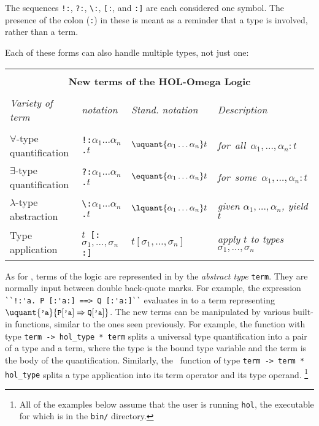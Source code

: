 The sequences {\small\verb|!:|}, {\small\verb|?:|}, {\small\verb|\:|},
{\small\verb|[:|}, and {\small\verb|:]|} are each considered one symbol.
The presence of the colon ({\small\verb|:|}) in these is meant as a reminder
that a type is involved, rather than a term.

Each of these forms can also handle multiple types, not just one:
\begin{center}
\begin{tabular}{|l|l|l|l|} \hline
\multicolumn{4}{|c|}{ } \\
\multicolumn{4}{|c|}{\bf New terms of the HOL-Omega Logic} \\
\multicolumn{4}{|c|}{ } \\
{\it Variety of term} & {\it \HOL{${}_\omega$} notation} &
{\it Stand. notation} &
{\it Description} \\ \hline
 & & & \\
$\forall$-type quantification & {\small\verb|!:|}$\alpha_1\ldots\alpha_n${\small\verb|.|}$t$ &
$\uquant{\alpha_1\ldots\alpha_n}t$ & {\it for\ all\ }$\alpha_1,\ldots,\alpha_n: t$ \\ \hline
$\exists$-type quantification & {\small\verb|?:|}$\alpha_1\ldots\alpha_n${\small\verb|.|}$t$ &
$\equant{\alpha_1\ldots\alpha_n}t$ & {\it for\ some\ }$\alpha_1,\ldots,\alpha_n: t$ \\ \hline
$\lambda$-type abstraction & {\small\verb|\:|}$\alpha_1\ldots\alpha_n${\small\verb|.|}$t$ &
$\lquant{\alpha_1\ldots\alpha_n}t$ & {\it given $\alpha_1,\ldots,\alpha_n$, yield $t$}\\ \hline
Type application & $t$\ {\small\verb|[:|}$\sigma_1,\ldots,\sigma_n${\small\verb|:]|} &
$t[\sigma_1,\ldots,\sigma_n]$ & {\it apply $t$ to types $\sigma_1,\ldots,\sigma_n$}\\ \hline
\end{tabular}
\end{center}\label{multiple-notation-table}

As for \HOL, terms of the \HOLW{} logic are represented in \ML{} by the
{\it abstract type\/} {\small\verb|term|}. They are normally input between
double back-quote marks.  For example, the expression
{\small\verb|``!:'a. P [:'a:] ==> Q [:'a:]``|} evaluates in \ML{}
to a term representing
$\uquant{\mbox{\small\texttt{'a}}}
{\mbox{\small\texttt{P}}[\mbox{\small\texttt{'a}}] \Rightarrow
 \mbox{\small\texttt{Q}}[\mbox{\small\texttt{'a}}]}$.
The new terms can be manipulated by various built-in \ML{} functions,
similar to the ones seen previously. For
example, the \ML{} function  with \ML{} type
{\small\verb|term -> hol_type * term|} splits a universal type quantification
into a pair of a type and a term, where the type is the bound type variable
and the term is the body of the quantification.
Similarly, the \ML\
function  of type {\small\verb|term -> term * hol_type|}
splits a type application into its term operator and its type operand.
\footnote
{All of the examples below assume that the user is running
\texttt{hol}, the executable for which is in the \texttt{bin/}
directory.}

